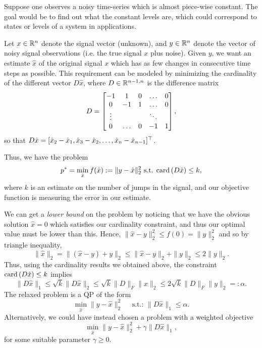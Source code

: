 \documentclass[11 pt]{scrartcl}
\begin{document}
\begin{example}
    Suppose one observes a noisy time-series which is almost piece-wise constant. 
    The goal would be to find out what the constant levels are, which could correspond to states or levels of a system in applications. 

    Let $x\in \mathbb R^n$ denote the signal vector (unknown), and $y\in \mathbb R^n$ denote the vector of noisy signal observations (i.e. the true signal $x$ plus noise). 
    Given $y$, we want an estimate $\hat{x}$ of the original signal $x$ which has as few changes in consecutive time steps as possible. 
    This requirement can be modeled by minimizing the cardinality of the different vector $D\hat{x}$, where $D\in \mathbb R^{n-1,n}$ is the difference matrix 
    \[ D = \begin{bmatrix} -1 & 1 & 0 & \dots & 0 \\ 0 & -1 & 1 & \dots & 0 \\  \vdots & & & \ddots &  \\ 0 & \dots & 0 & -1 & 1 \end{bmatrix},\] 
    so that $D\hat{x} = [\hat{x}_2-\hat{x}_1, \hat{x}_3-\hat{x}_2, \dots, \hat{x}_n - \hat{x}_{n-1}]^\top$. 

    Thus, we have the problem 
    \[ p^* = \min_{\hat{x}} f(\hat{x}) := \|y-\hat{x}\|_2^2\text{ s.t. } \text{card}\,(D\hat{x}) \leq k, \] 
    where $k$ is an estimate on the number of jumps in the signal, and our objective function is measuring the error in our estimate. 

    We can get a \emph{lower bound} on the problem by noticing that we have the obvious solution $\hat{x} = 0$ which satisfies our cardinality constraint, and thus our optimal value must be lower than this. 
    Hence, $\|\hat{x}-y\|_2^2 \leq f(0) = \|y\|_2^2$ and so by triangle inequality, 
    \[ \|\hat{x}\|_2 = \|(\hat{x} - y) + y\|_2 \leq \|\hat{x}-y\|_2 + \|y\|_2 \leq 2\|y\|_2.\] 
Thus, using the cardinality results we obtained above, the constraint $\text{card}\,(D\hat{x}) \leq k$ implies 
    \[ \|D\hat{x}\|_1 \leq \sqrt{k} \| D\hat{x}\|_2 \leq \sqrt{k} \|D\|_F \|x\|_2 \leq 2\sqrt{k}\|D\|_F\|y\|_2 =: \alpha.\]
    The relaxed problem is a QP of the form 
    \[ \min_{\hat{x}} \|y - \hat{x}\|_2^2 \quad \text{ s.t.: } \|D\hat{x}\|_1 \leq \alpha.\] 
    Alternatively, we could have instead chosen a problem with a weighted objective 
    \[ \min_{\hat{x}} \|y - \hat{x} \|_2^2 + \gamma \|D\hat{x}\|_1,\] 
    for some suitable parameter $\gamma \geq 0$. 
\end{example}
\end{document}
